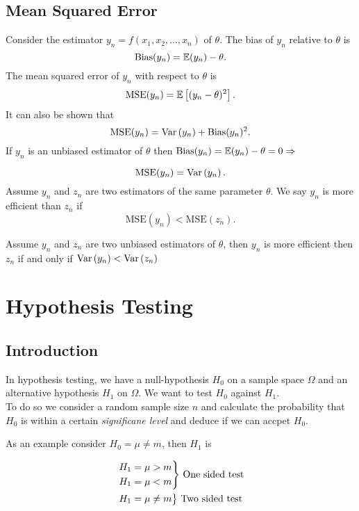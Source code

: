 \documentclass{report}
\begin{document}
\section{Mean Squared Error}

Consider the estimator $y_n = f(x_1,x_2,\dots,x_n)$ of $\theta$. The bias of $y_n$ relative to $\theta$ is
\[
	\mathrm{Bias}(y_n)=\mathbb{E}(y_n)-\theta
	.\]
The mean squared error of $y_n$ with respect to $\theta$ is
\[
	\mathrm{MSE}(y_n)=\mathbb{E}\left[(y_n-\theta)^2\right]
	.\]
It can also be shown that
\[
	\mathrm{MSE}(y_n)=\mathrm{Var}\left( y_n \right) + \mathrm{Bias}(y_n)^2
	.\]
If $y_n$ is an unbiased estimator of $\theta$ then $\mathrm{Bias}(y_n)=\mathbb{E}(y_n)-\theta=0\Rightarrow$

\[
	\mathrm{MSE}(y_n)=\mathrm{Var}\left( y_n \right)
	.\]
Assume $y_n$ and $z_n$ are two estimators of the same parameter $\theta$. We say $y_n$ is more efficient than $z_n$ if
\[
	\mathrm{MSE}(y_n)<\mathrm{MSE}(z_n)
	.\]

Assume $y_n$ and $z_n$ are two unbiased estimators of $\theta$, then $y_n$ is more efficient then $z_n$ if and only if $\mathrm{Var}\left( y_n \right)<\mathrm{Var}\left( z_n \right)$

\chapter{Hypothesis Testing}

\section{Introduction}

In hypothesis testing, we have a null-hypothesis $H_0$ on a sample space $\Omega$ and an alternative hypothesis $H_1$ on $\Omega$. We want to test $H_0$ against $H_1$.\\

To do so we consider a random sample size $n$ and calculate the probability that $H_0$ is within a certain \emph{significane level} and deduce if we can accpet $H_0$.

As an example consider $H_0 = \mu\neq m$, then $H_1$ is

\begin{align*}
	 & \begin{rcases}
		   H_1 = \mu > m \\
		   H_1 = \mu < m \\
	   \end{rcases}\, \text{One sided test} \\
	 & \begin{rcases}
		   H_1 = \mu \neq m
	   \end{rcases}\, \text{Two sided test}
\end{align*}
\end{document}
